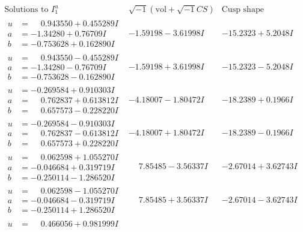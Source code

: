 \documentclass[1p]{elsarticle_modified}
\theoremstyle{definition}
\newcommand{\I}{\sqrt{-1}}
\begin{document}
$$\begin{array}{c|c|c}  
\text{Solutions to }I^u_{1}& \I (\text{vol} + \sqrt{-1}CS) & \text{Cusp shape}\\
 \hline 
\begin{aligned}
u &= \phantom{-}0.943550 + 0.455289 I \\
a &= -1.34280 + 0.76709 I \\
b &= -0.753628 + 0.162890 I\end{aligned}
 & -1.59198 - 3.61998 I & -15.2323 + 5.2048 I \\ \hline\begin{aligned}
u &= \phantom{-}0.943550 - 0.455289 I \\
a &= -1.34280 - 0.76709 I \\
b &= -0.753628 - 0.162890 I\end{aligned}
 & -1.59198 + 3.61998 I & -15.2323 - 5.2048 I \\ \hline\begin{aligned}
u &= -0.269584 + 0.910303 I \\
a &= \phantom{-}0.762837 + 0.613812 I \\
b &= \phantom{-}0.657573 - 0.228220 I\end{aligned}
 & -4.18007 - 1.80472 I & -18.2389 + 0.1966 I \\ \hline\begin{aligned}
u &= -0.269584 - 0.910303 I \\
a &= \phantom{-}0.762837 - 0.613812 I \\
b &= \phantom{-}0.657573 + 0.228220 I\end{aligned}
 & -4.18007 + 1.80472 I & -18.2389 - 0.1966 I \\ \hline\begin{aligned}
u &= \phantom{-}0.062598 + 1.055270 I \\
a &= -0.046684 + 0.319719 I \\
b &= -0.250114 - 1.286520 I\end{aligned}
 & \phantom{-}7.85485 - 3.56337 I & -2.67014 + 3.62743 I \\ \hline\begin{aligned}
u &= \phantom{-}0.062598 - 1.055270 I \\
a &= -0.046684 - 0.319719 I \\
b &= -0.250114 + 1.286520 I\end{aligned}
 & \phantom{-}7.85485 + 3.56337 I & -2.67014 - 3.62743 I \\ \hline\begin{aligned}
u &= \phantom{-}0.466056 + 0.981999 I \\

\end{aligned}
\end{array}$$
\end{document}
